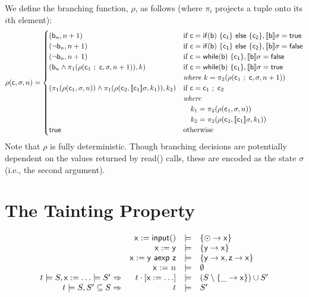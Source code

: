 \documentclass[]{article}
\newcommand{\lsyn}{[\![}
\newcommand{\rsyn}{]\!]}
\begin{document}
We define the branching function, $\rho$, as follows (where $\pi_i$ projects a tuple onto its $i$th element):
\[ 
\rho({\sf c},\sigma,n) = \begin{cases} 
({\sf b}_n,n+1) &
	\mbox{if } {\sf c}={\sf if (b)\ \{ c_1 \}\ else\ \{ c_2 \}},\lsyn {\sf b} \rsyn\sigma = {\sf true} \\ 
(\neg {\sf b}_n,n+1) &
	\mbox{if } {\sf c}={\sf if (b)\ \{ c_1 \}\ else\ \{ c_2 \}},\lsyn {\sf b} \rsyn\sigma = {\sf false} \\ 
(\neg {\sf b}_n,n+1) &
	\mbox{if } {\sf c}={\sf while (b)\ \{ c_1 \}},\lsyn {\sf b} \rsyn\sigma = {\sf false} \\ 
({\sf b}_n \wedge \pi_1(\rho({\sf c}_1\ ;\ {\sf c},\sigma,n+1)),k) &\mbox{if } {\sf c}={\sf while (b)\ \{ c_1 \}},\lsyn {\sf b} \rsyn\sigma = {\sf true} \\ 
& \textit{where}\ k = \pi_2(\rho({\sf c}_1\ ;\ {\sf c},\sigma,n+1)) \\
(\pi_1(\rho({\sf c}_1,\sigma,n)) \wedge  \pi_1(\rho({\sf c}_2,\lsyn {\sf c}_1 \rsyn \sigma,k_1)),k_2) &\mbox{if } {\sf c}={\sf c}_1\ ;\ {\sf c}_2 \\ 
& \textit{where} \\
& \quad k_1 = \pi_2(\rho({\sf c}_1,\sigma,n)) \\
& \quad k_2 = \pi_2(\rho({\sf c}_2,\lsyn {\sf c}_1 \rsyn \sigma,k_1)) \\
{\sf true} & \mbox{otherwise}
\end{cases}
\]
Note that $\rho$ is fully deterministic. Though branching decisions are potentially dependent on the values returned by {\sf read()} calls, these are encoded as the state $\sigma$ (i.e., the second argument).

\section{The Tainting Property}

$$
\begin{array}{rrcl}
& {\sf x := input()} & \models & \{ \odot \rightarrow {\sf x} \} \\
& {\sf x := y} & \models & \{ {\sf y} \rightarrow {\sf x} \}\\
& {\sf x := y\ aexp\ z} & \models & \{ {\sf y} \rightarrow {\sf x},{\sf z} \rightarrow {\sf x} \} \\
& \textsf{x := $n$} & \models & \emptyset\\
t \models S,{\sf x := \ldots} \models S' \Rightarrow & t \cdot [{\sf x := \ldots}] & \models & (S \setminus \{ \_ \rightarrow {\sf x} \}) \cup S' \\
t \models S,S' \subseteq S \Rightarrow & t & \models & S' \\
\end{array}
$$
\end{document}
